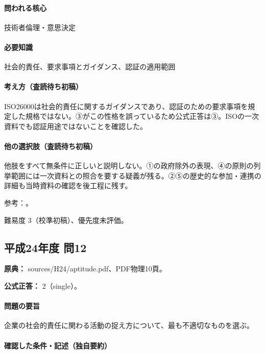 \paragraph{問われる核心} 技術者倫理・意思決定

\paragraph{必要知識} 社会的責任、要求事項とガイダンス、認証の適用範囲

\paragraph{考え方（査読待ち初稿）} ISO26000は社会的責任に関するガイダンスであり、認証のための要求事項を規定した規格ではない。③がこの性格を誤っているため公式正答は③。ISOの一次資料でも認証用途ではないことを確認した。

\paragraph{他の選択肢（査読待ち初稿）} 他肢をすべて無条件に正しいと説明しない。①の政府除外の表現、④の原則の列挙範囲には一次資料との照合を要する疑義が残る。②⑤の歴史的な参加・連携の詳細も当時資料の確認を後工程に残す。

\par 参考：\cite{iso26000}。

\par 難易度 3（校準初稿）、優先度未評価。

\subsection{平成24年度 問12}
\label{q:h24-reg-apt-12}

\noindent\textbf{原典：} sources/H24/aptitude.pdf、PDF物理10頁。

\textbf{公式正答：} 2（single）。

\paragraph{問題の要旨} 企業の社会的責任に関わる活動の捉え方について、最も不適切なものを選ぶ。

\paragraph{確認した条件・記述（独自要約）}\mbox{}\par

